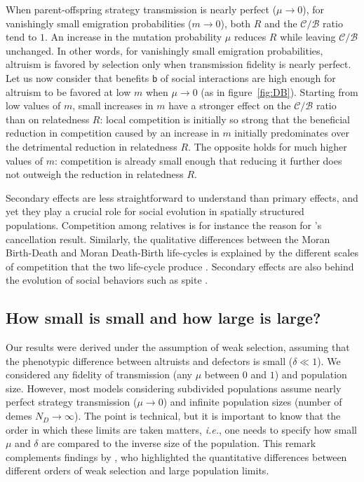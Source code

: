 \documentclass[11pt, letterpaper]{article}
\newcommand{\ie}{\textit{i.e.}}
\newcommand{\bb}{\mathsf{b}}
\newcommand{\cc}{\mathsf{c}}
\newcommand{\out}{\textrm{out}}
\newcommand{\Qout}{Q_{\out}}
\newcommand{\ndemes}{N_D}
\newcommand{\selstr}{\delta}
\begin{document}
When parent-offspring strategy transmission is nearly perfect ($\mu \to 0$), for vanishingly small emigration probabilities ($m \to 0$), both $R$ and the $\mathcal{C}/\mathcal{B}$ ratio tend to $1$. An increase in the mutation probability $\mu$ reduces $R$ while leaving $\mathcal{C}/\mathcal{B}$ unchanged. In other words, for vanishingly small emigration probabilities, altruism is favored by selection only when transmission fidelity is nearly perfect. Let us now consider that benefits $\bb$ of social interactions are high enough for altruism to be favored at low $m$ when $\mu \to 0$ (as in figure~\ref{fig:DB}). Starting from low values of $m$, small increases in $m$ have a stronger effect on the $\mathcal{C}/\mathcal{B}$ ratio than on relatedness $R$: local competition is initially so strong that the beneficial reduction in competition caused by an increase in $m$ initially predominates over the detrimental reduction in relatedness $R$. The opposite holds for much higher values of $m$: competition is already small enough that reducing it further does not outweigh the reduction in relatedness $R$. 

Secondary effects are less straightforward to understand than primary effects, and yet they play a crucial role for social evolution in spatially structured populations. Competition among relatives is for instance the reason for \citet{Taylor1992}'s cancellation result. Similarly, the qualitative differences between the Moran Birth-Death and Moran Death-Birth life-cycles is explained by the different scales of competition that the two life-cycle produce \citep{GrafenArchetti2008, DebarreHD2014}. Secondary effects are also behind the evolution of social behaviors such as spite \citep{WestGardner2010}. 


\subsection*{How small is small and how large is large?}
Our results were derived under the assumption of weak selection, assuming that the phenotypic difference between altruists and defectors is small ($\selstr \ll 1$). We considered any fidelity of transmission (any $\mu$ between $0$ and $1$) and population size. However, most models considering subdivided populations assume nearly perfect strategy transmission ($\mu \to 0$) and infinite population sizes (number of demes $\ndemes \to \infty$). The point is technical, but it is important to know that the order in which these limits are taken matters, \ie, one needs to specify how small $\mu$ and $\selstr$ are compared to the inverse size of the population. This remark complements findings by \citet{SampleAllen2017}, who highlighted the quantitative differences between different orders of weak selection and large population limits. 
\end{document}
